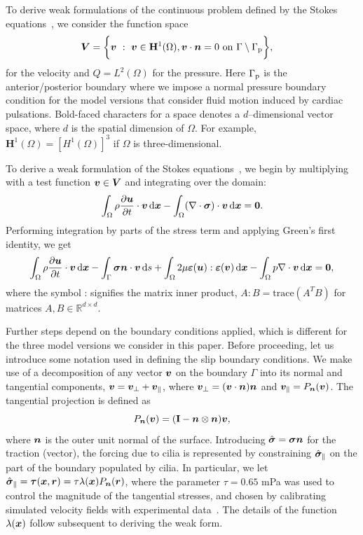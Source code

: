 \documentclass{WileyMSP-template}
\begin{document}
To derive weak formulations of the continuous problem defined by the Stokes
equations~, we consider the function space
\begin{align*}
    \bm{V} &= \bigg\{\bm{v} \ : \ \bm{v}\in\mathbf{H}^1(\Omega),
    \bm{v}\cdot\bm{n}=0 \ \mathrm{on} \ \Gamma\setminus\Gamma_{\mathrm{p}}\bigg\},
\end{align*}
for the velocity and $Q=L^2(\Omega)$ for the pressure.
Here $\Gamma_{\mathrm{p}}$ is the anterior/posterior boundary where we impose a normal pressure
boundary condition for the model versions that consider fluid motion induced by
cardiac pulsations. Bold-faced characters for a space denotes a $d$--dimensional vector space,
where $d$ is the spatial dimension of $\Omega$. For example,
$\mathbf{H}^1(\Omega) = [H^1(\Omega)]^3$ if $\Omega$ is three-dimensional.

To derive a weak formulation of the Stokes equations~,
we begin by multiplying~ with a
test function $\bm{v}\in\bm{V}$ and integrating over the domain:
\begin{equation*}
    \int_{\Omega}\rho\frac{\partial \bm{u}}{\partial t}\cdot\bm{v} \, \mathrm d\bm{x} - \int_{\Omega}(\nabla\cdot\bm{\sigma})\cdot\bm{v} \, \mathrm d\bm{x} = \mathbf{0}.
\end{equation*}
Performing integration by parts of the stress term and applying Green's first identity, we get
\begin{equation}
    \int_{\Omega}\rho\frac{\partial \bm{u}}{\partial t}\cdot\bm{v} \, \mathrm d\bm{x}
    - \int_{\Gamma}\bm{\sigma}\bm{n}\cdot\bm{v} \, \mathrm ds
    + \int_{\Omega}2\mu\bm{\varepsilon}(\bm{u}) : \bm{\varepsilon}(\bm{v}) \, \mathrm d\bm{x}
    - \int_{\Omega}p\nabla\cdot\bm{v} \, \mathrm d\bm{x} = \mathbf{0}, \label{eq:modelA_weak_form1}
\end{equation}
where the symbol : signifies the matrix inner product,
$A:B=\text{trace}{(A^TB)}$ for matrices $A, B\in\mathbb{R}^{d\times d}$. 

Further steps depend on the boundary conditions applied,
which is different for the three model versions we consider in this paper.
Before proceeding, let us introduce some notation used in defining the
slip boundary conditions. We make use of a decomposition
of any vector $\bm{v}$ on the boundary $\Gamma$ into its normal and tangential components,
$\bm{v} = \bm{v}_{\perp} + \bm{v}_{\parallel}$, where $\bm{v}_{\perp}=(\bm{v}\cdot\bm{n})\bm{n}$ and
$\bm{v}_{\parallel}=P_{\bm{n}}(\bm{v})$. The tangential projection is defined as
\begin{equation}
    P_{\bm{n}}(\bm{v}) = (\mathbf{I} - \bm{n}\otimes\bm{n})\bm{v},
    \label{eq:projection_operator_appendix}
\end{equation}
where $\bm{n}$ is the outer unit normal of the surface. Introducing
$\hat{\bm{\sigma}} = \bm{\sigma}\bm{n}$ for the traction (vector), the forcing due
to cilia is represented by constraining $\hat{\bm{\sigma}}_{\parallel}$ on the part of the
boundary populated by cilia. In particular, we let
$\hat{\bm{\sigma}}_{\parallel} = \bm{\tau}(\bm{x}, \bm{r}) = \tau\lambda(\bm{x}) P_{\bm{n}}(\bm{r})$,
where the parameter $\tau=0.65$ mPa was used to control the magnitude
of the tangential stresses, and chosen by calibrating simulated velocity
fields with experimental data~\cite{Olstad2019CiliaryDevelopment}.
The details of the function $\lambda(\bm{x})$ follow subsequent to deriving the weak form.
\end{document}
